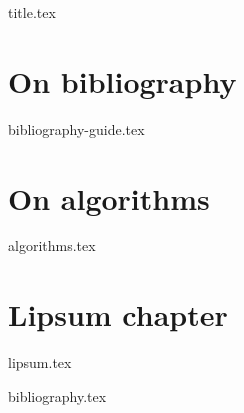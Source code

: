 \documentclass[a4paper,11pt,oneside]{book}
\begin{document}
 
\frontmatter
{title.tex}
 
\clearpage
\thispagestyle{empty}
 
\tableofcontents
 
\mainmatter
\chapter{On bibliography}
{bibliography-guide.tex}
 
\chapter{On algorithms}
{algorithms.tex}
 
\chapter{Lipsum chapter}
{lipsum.tex}
 
\backmatter
 
{bibliography.tex}
 
\end{document}
